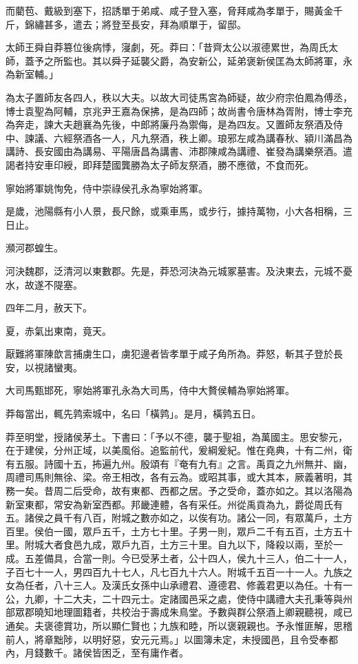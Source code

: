 \begin{pinyinscope}
而藺苞、戴級到塞下，招誘單于弟咸、咸子登入塞，脅拜咸為孝單于，賜黃金千斤，錦繡甚多，遣去；將登至長安，拜為順單于，留邸。

太師王舜自莽篡位後病悸，寖劇，死。莽曰：「昔齊太公以淑德累世，為周氏太師，蓋予之所監也。其以舜子延襲父爵，為安新公，延弟褒新侯匡為太師將軍，永為新室輔。」

為太子置師友各四人，秩以大夫。以故大司徒馬宮為師疑，故少府宗伯鳳為傅丞，博士袁聖為阿輔，京兆尹王嘉為保拂，是為四師；故尚書令唐林為胥附，博士李充為奔走，諫大夫趙襄為先後，中郎將廉丹為禦侮，是為四友。又置師友祭酒及侍中、諫議、六經祭酒各一人，凡九祭酒，秩上卿。琅邪左咸為講春秋、潁川滿昌為講詩、長安國由為講易、平陽唐昌為講書、沛郡陳咸為講禮、崔發為講樂祭酒。遣謁者持安車印綬，即拜楚國龔勝為太子師友祭酒，勝不應徵，不食而死。

寧始將軍姚恂免，侍中崇祿侯孔永為寧始將軍。

是歲，池陽縣有小人景，長尺餘，或乘車馬，或步行，據持萬物，小大各相稱，三日止。

瀕河郡蝗生。

河決魏郡，泛清河以東數郡。先是，莽恐河決為元城冢墓害。及決東去，元城不憂水，故遂不隄塞。

四年二月，赦天下。

夏，赤氣出東南，竟天。

厭難將軍陳歆言捕虜生口，虜犯邊者皆孝單于咸子角所為。莽怒，斬其子登於長安，以視諸蠻夷。

大司馬甄邯死，寧始將軍孔永為大司馬，侍中大贅侯輔為寧始將軍。

莽每當出，輒先鹑索城中，名曰「橫鹑」。是月，橫鹑五日。

莽至明堂，授諸侯茅土。下書曰：「予以不德，襲于聖祖，為萬國主。思安黎元，在于建侯，分州正域，以美風俗。追監前代，爰綱爰紀。惟在堯典，十有二州，衛有五服。詩國十五，抪遍九州。殷頌有『奄有九有』之言。禹貢之九州無并、幽，周禮司馬則無徐、梁。帝王相改，各有云為。或昭其事，或大其本，厥義著明，其務一矣。昔周二后受命，故有東都、西都之居。予之受命，蓋亦如之。其以洛陽為新室東都，常安為新室西都。邦畿連體，各有采任。州從禹貢為九，爵從周氏有五。諸侯之員千有八百，附城之數亦如之，以俟有功。諸公一同，有眾萬戶，土方百里。侯伯一國，眾戶五千，土方七十里。子男一則，眾戶二千有五百，土方五十里。附城大者食邑九成，眾戶九百，土方三十里。自九以下，降殺以兩，至於一成。五差備具，合當一則。今已受茅土者，公十四人，侯九十三人，伯二十一人，子百七十一人，男四百九十七人，凡七百九十六人。附城千五百一十一人。九族之女為任者，八十三人。及漢氏女孫中山承禮君、遵德君、修義君更以為任。十有一公，九卿，十二大夫，二十四元士。定諸國邑采之處，使侍中講禮大夫孔秉等與州部眾郡曉知地理圖籍者，共校治于壽成朱鳥堂。予數與群公祭酒上卿親聽視，咸已通矣。夫褒德賞功，所以顯仁賢也；九族和睦，所以褒親親也。予永惟匪解，思稽前人，將章黜陟，以明好惡，安元元焉。」以圖簿未定，未授國邑，且令受奉都內，月錢數千。諸侯皆困乏，至有庸作者。


\end{pinyinscope}
